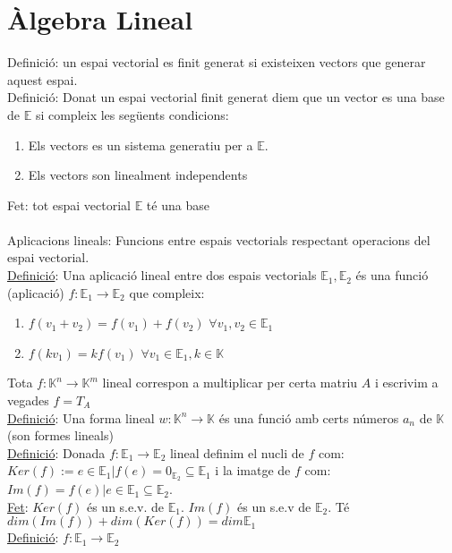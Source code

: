 \section{Àlgebra Lineal}
\newpage
{}
Definició: un espai vectorial es finit generat si existeixen vectors que generar aquest espai. \\
Definició: Donat un espai vectorial finit generat diem que un vector es una base de $\mathbb{E}$ si compleix les següents condicions:
\begin{enumerate}
    \item Els vectors es un sistema generatiu per a $\mathbb{E}$.
    \item Els vectors son linealment independents
\end{enumerate}
Fet: tot espai vectorial $\mathbb{E}$ té una base\\
\\Aplicacions lineals: Funcions entre espais vectorials respectant operacions del espai vectorial. \\
\underline{Definició}: Una aplicació lineal entre dos espais vectorials $\mathbb{E}_1, \mathbb{E}_2$ és una funció (aplicació) $f: \mathbb{E}_1 \rightarrow \mathbb{E}_2$ que compleix:\begin{enumerate}
    \item $f(v_1 + v_2) = f(v_1) + f(v_2)$ $\forall v_1, v_2 \in \mathbb{E}_1$
    \item $f(k v_1) = k f(v_1)$ $\forall v_1 \in \mathbb{E}_1, k \in \mathbb{K}$
\end{enumerate}
Tota $f: \mathbb{K}^n \rightarrow \mathbb{K}^m$ lineal correspon a multiplicar per certa matriu $A$ i escrivim a vegades $f = T_A$\\
\underline{Definició}: Una forma lineal $w: \mathbb{K}^n \rightarrow \mathbb{K}$ és una funció amb certs números $a_n$ de $\mathbb{K}$ (son formes lineals)\\
\underline{Definició}: Donada $f: \mathbb{E}_1 \rightarrow \mathbb{E}_2$ lineal definim el nucli de $f$ com: $Ker(f) := {e \in \mathbb{E}_1 | f(e) = 0_{\mathbb{E}_2}} \subseteq \mathbb{E}_1$ i la imatge de $f$ com: $Im(f) = {f(e) | e \in \mathbb{E}_1} \subseteq \mathbb{E}_2$.\\
\underline{Fet}: $Ker(f)$ és un s.e.v. de $\mathbb{E}_1$. $Im(f)$ és un s.e.v de $\mathbb{E}_2$. Té $dim(Im(f)) + dim(Ker(f)) = dim \mathbb{E}_1$\\
\underline{Definició}: $f: \mathbb{E}_1 \rightarrow \mathbb{E}_2$\\
